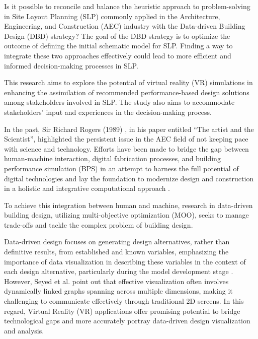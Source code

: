 

Is it possible to reconcile and balance the heuristic approach to problem-solving in Site Layout Planning (SLP) commonly applied in the Architecture, Engineering, and Construction (AEC) industry with the Data-driven Building Design (DBD) strategy? The goal of the DBD strategy is to optimize the outcome of defining the initial schematic model for SLP. Finding a way to integrate these two approaches effectively could lead to more efficient and informed decision-making processes in SLP.

This research aims to explore the potential of virtual reality (VR) simulations in enhancing the assimilation of recommended performance-based design solutions among stakeholders involved in SLP. The study also aims to accommodate stakeholders' input and experiences in the decision-making process.

In the past, Sir Richard Rogers (1989) \cite{Rogers1989}, in his paper entitled “The artist and the Scientist”, highlighted the persistent issue in the AEC field of not keeping pace with science and technology. Efforts have been made to bridge the gap between human-machine interaction, digital fabrication processes, and building performance simulation (BPS) \cite{Naboni2015} in an attempt to harness the full potential of digital technologies and lay the foundation to modernize design and construction in a holistic and integrative computational approach \cite{Knippers2021}. 

To achieve this integration between human and machine, research in data-driven building design, utilizing multi-objective optimization (MOO), seeks to manage trade-offs and tackle the complex problem of building design.

Data-driven design focuses on generating design alternatives, rather than definitive results, from established and known variables, emphasizing the importance of data visualization in describing these variables in the context of each design alternative, particularly during the model development stage \cite{Burton2018}.
However, Seyed et al. \cite{Seyed2022} point out that effective visualization often involves dynamically linked graphs spanning across multiple dimensions, making it challenging to communicate effectively through traditional 2D screens. In this regard, Virtual Reality (VR) applications offer promising potential to bridge technological gaps and more accurately portray data-driven design visualization and analysis. 

